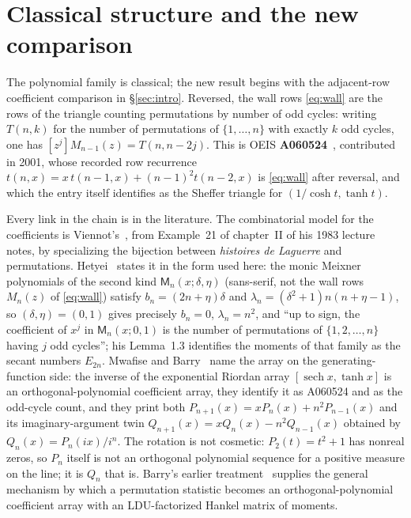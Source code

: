 \documentclass[11pt,a4paper]{article}
\theoremstyle{plain}
\theoremstyle{definition}
\theoremstyle{remark}
\begin{document}
\section{Classical structure and the new comparison}\label{sec:classical}

The polynomial family is classical; the new result begins with the adjacent-row
coefficient comparison in \S\ref{sec:intro}. Reversed, the
wall rows \eqref{eq:wall} are the rows of the triangle counting permutations by
number of odd cycles: writing $T(n,k)$ for the number of permutations of
$\{1,\dots,n\}$ with exactly $k$ odd cycles, one has $[z^j]M_{n-1}(z)=T(n,n-2j)$.
This is OEIS \textbf{A060524}~\cite{oeisA060524}, contributed in 2001, whose
recorded row recurrence $t(n,x)=x\,t(n-1,x)+(n-1)^2t(n-2,x)$ is \eqref{eq:wall}
after reversal, and which the entry itself identifies as the Sheffer triangle
for $(1/\cosh t,\tanh t)$.

Every link in the chain is in the literature. The combinatorial model for the
coefficients is Viennot's~\cite{viennot1983}, from Example~21 of chapter~II of
his 1983 lecture notes, by specializing the bijection between \emph{histoires de
Laguerre} and permutations. Hetyei~\cite{hetyei2010} states it in the form used
here: the monic Meixner polynomials of the second kind $\mathsf{M}_n(x;\delta,\eta)$
(sans-serif, not the wall rows $M_n(z)$ of \eqref{eq:wall})
satisfy $b_n=(2n+\eta)\delta$ and $\lambda_n=(\delta^2+1)n(n+\eta-1)$, so
$(\delta,\eta)=(0,1)$ gives precisely $b_n=0$, $\lambda_n=n^2$, and ``up to
sign, the coefficient of $x^j$ in $\mathsf{M}_n(x;0,1)$ is the number of permutations of
$\{1,2,\dots,n\}$ having $j$ odd cycles''; his Lemma~1.3 identifies the moments
of that family as the secant numbers $E_{2n}$. Mwafise and
Barry~\cite{mwafiseBarry2021} name the array on the generating-function side:
the inverse of the exponential Riordan array $[\operatorname{sech}x,\tanh x]$ is
an orthogonal-polynomial coefficient array, they identify it as A060524 and as
the odd-cycle count, and they print both $P_{n+1}(x)=xP_n(x)+n^2P_{n-1}(x)$ and
its imaginary-argument twin $Q_{n+1}(x)=xQ_n(x)-n^2Q_{n-1}(x)$ obtained by
$Q_n(x)=P_n(ix)/i^n$. The rotation is not cosmetic: $P_2(t)=t^2+1$ has nonreal
zeros, so $P_n$ itself is not an orthogonal polynomial sequence for a positive
measure on the line; it is $Q_n$ that is. Barry's earlier
treatment~\cite{barry2010} supplies the general mechanism by which a permutation
statistic becomes an orthogonal-polynomial coefficient array with an
LDU-factorized Hankel matrix of moments.
\end{document}
